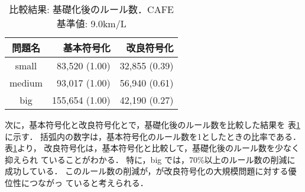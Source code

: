 \begin{table}[tb]
 \caption{比較結果: 基礎化後のルール数．CAFE基準値: 9.0km/L}
 \centering
 \begin{tabular}{crr} \bhline
  問題名    & 基本符号化    & 改良符号化    \\ \hline
  small	    &  83,520 (1.00)  & 32,855 (0.39) \\ 
  medium    &  93,017 (1.00)  & 56,940 (0.61) \\
  big	    & 155,654 (1.00)  & 42,190 (0.27) \\ \hline
 \end{tabular}
 \label{tab:rule}
\end{table}

次に，基本符号化と改良符号化とで，基礎化後のルール数を比較した結果を
表\ref{tab:rule}に示す．
括弧内の数字は，基本符号化のルール数を1としたときの比率である．
表\ref{tab:rule}より，
改良符号化は，基本符号化と比較して，基礎化後のルール数を少なく抑えられ
ていることがわかる．
特に，big では，70\%以上のルール数の削減に成功している．
このルール数の削減が，が改良符号化の大規模問題に対する優位性につながっ
ていると考えられる．

